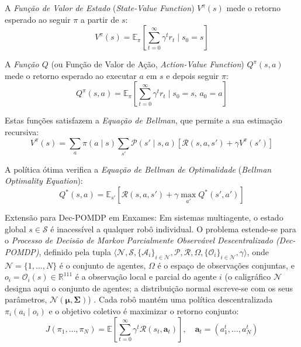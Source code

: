 \documentclass[12pt,reqno, twoside]{amsbook}
\makeatletter
\def\paragraph{\@startsection{paragraph}{4}%
  \z@\z@{-\fontdimen2\font}%
  {\normalfont\bfseries}}
\theoremstyle{plain}
\numberwithin{equation}{chapter}
\numberwithin{section}{chapter}
\numberwithin{table}{chapter}
\numberwithin{figure}{chapter}
\makeatother
\begin{document}
A \emph{Função de Valor de Estado} (\textit{State-Value Function}) $V^\pi(s)$ mede o retorno esperado ao seguir $\pi$ a partir de $s$:
\begin{equation}
    V^\pi(s) = \mathbb{E}_\pi\!\left[\sum_{t=0}^{\infty} \gamma^t r_t \;\Big|\; s_0 = s\right]
    \label{eq:value_function}
\end{equation}

A \emph{Função $Q$} (ou Função de Valor de Ação, \textit{Action-Value Function}) $Q^\pi(s,a)$ mede o retorno esperado ao executar $a$ em $s$ e depois seguir $\pi$:
\begin{equation}
    Q^\pi(s,a) = \mathbb{E}_\pi\!\left[\sum_{t=0}^{\infty} \gamma^t r_t \;\Big|\; s_0 = s,\, a_0 = a\right]
    \label{eq:q_function}
\end{equation}

Estas funções satisfazem a \emph{Equação de Bellman}, que permite a sua estimação recursiva:
\begin{equation}
    V^\pi(s) = \sum_{a} \pi(a\mid s) \sum_{s'} \mathcal{P}(s'\mid s,a)\!\left[\mathcal{R}(s,a,s') + \gamma V^\pi(s')\right]
    \label{eq:bellman}
\end{equation}

A política ótima verifica a \emph{Equação de Bellman de Optimalidade} (\textit{Bellman Optimality Equation}):
\begin{equation}
    Q^*(s,a) = \mathbb{E}_{s'}\!\left[\mathcal{R}(s,a,s') + \gamma \max_{a'} Q^*(s',a')\right]
    \label{eq:bellman_optimal}
\end{equation}

\paragraph{Extensão para Dec-POMDP em Enxames:}
Em sistemas multiagente, o estado global $s \in \mathcal{S}$ é inacessível a qualquer robô individual. O problema estende-se para o \emph{Processo de Decisão de Markov Parcialmente Observável Descentralizado (Dec-POMDP)}, definido pela tupla $\langle \mathcal{N}, \mathcal{S}, \{\mathcal{A}_i\}_{i \in \mathcal{N}}, \mathcal{P}, \mathcal{R}, \Omega, \{\mathcal{O}_i\}_{i \in \mathcal{N}}, \gamma \rangle$, onde $\mathcal{N} = \{1,\ldots,N\}$ é o conjunto de agentes, $\Omega$ é o espaço de observações conjuntas, e $o_i = \mathcal{O}_i(s) \in \mathbb{R}^{111}$ é a observação local e parcial do agente $i$ (o caligráfico $\mathcal{N}$ designa aqui o conjunto de agentes; a distribuição normal escreve-se com os seus parâmetros, $\mathcal{N}(\boldsymbol{\mu}, \boldsymbol{\Sigma})$) \cite{oliehoek2016concise, sutton2018reinforcement, huh2023marl}. Cada robô mantém uma política descentralizada $\pi_i(a_i \mid o_i)$ e o objetivo coletivo é maximizar o retorno conjunto:
\begin{equation}
    J(\pi_1, \ldots, \pi_N) = \mathbb{E}\!\left[\sum_{t=0}^{\infty} \gamma^t \mathcal{R}(s_t, \mathbf{a}_t)\right], \quad \mathbf{a}_t = (a_1^t, \ldots, a_N^t)
    \label{eq:dec_pomdp_obj}
\end{equation}
\end{document}
